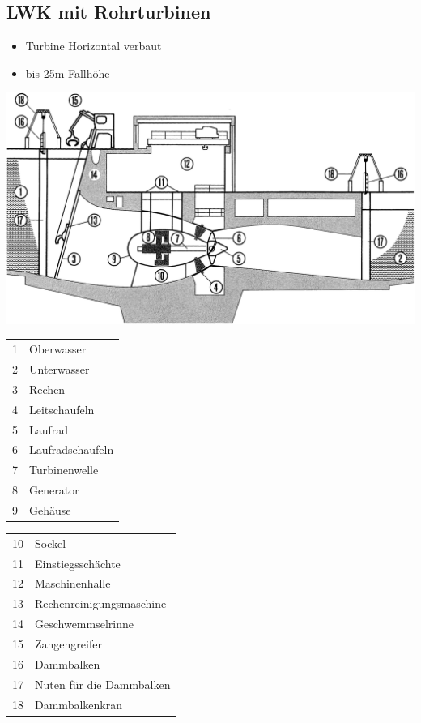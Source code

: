 \subsection{LWK mit Rohrturbinen}

\begin{itemize}
    \item Turbine Horizontal verbaut
    \item bis 25m Fallhöhe
\end{itemize}

\begin{center}
    \includegraphics[width=0.95\columnwidth, align=c]{images/Laufwasserkraftwerke_Kaplanturbine_Horizontal.png}
\end{center}

\begin{minipage}[t]{0.38\columnwidth}
    \begin{tabular}{c l}
        1 & Oberwasser \\
        2 & Unterwasser \\
        3 & Rechen \\
        4 & Leitschaufeln \\
        5 & Laufrad \\
        6 & Laufradschaufeln \\
        7 & Turbinenwelle \\
        8 & Generator \\
        9 & Gehäuse \\
    \end{tabular}
\end{minipage}
\hfill
\begin{minipage}[t]{0.58\columnwidth}
    \begin{tabular}{c l}
        10 & Sockel \\
        11 & Einstiegsschächte \\
        12 & Maschinenhalle \\
        13 & Rechenreinigungsmaschine \\
        14 & Geschwemmselrinne \\
        15 & Zangengreifer \\
        16 & Dammbalken \\
        17 & Nuten für die Dammbalken \\
        18 & Dammbalkenkran \\
    \end{tabular}
\end{minipage}


